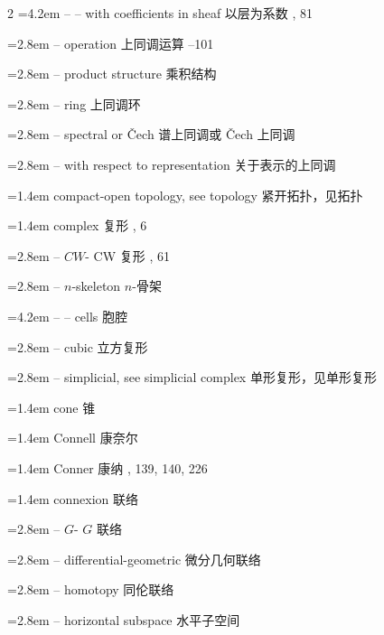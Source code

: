 \begin{multicols}{2}
\noindent\hangindent=4.2em -- -- with coefficients in sheaf \quad 以层为系数 , 81\par
\noindent\hangindent=2.8em -- operation \quad 上同调运算 --101\par
\noindent\hangindent=2.8em -- product structure \quad 乘积结构 \par
\noindent\hangindent=2.8em -- ring \quad 上同调环 \par
\noindent\hangindent=2.8em -- spectral or \v{C}ech \quad 谱上同调或 \v{C}ech 上同调 \par
\noindent\hangindent=2.8em -- with respect to representation \quad 关于表示的上同调 \par
\noindent\hangindent=1.4em compact-open topology, see topology \quad 紧开拓扑，见拓扑 \quad\par
\noindent\hangindent=1.4em complex \quad 复形 , 6\par
\noindent\hangindent=2.8em -- $CW$- \quad CW 复形 , 61\par
\noindent\hangindent=2.8em -- $n$-skeleton \quad $n$-骨架 \par
\noindent\hangindent=4.2em -- -- cells \quad 胞腔 \par
\noindent\hangindent=2.8em -- cubic \quad 立方复形 \par
\noindent\hangindent=2.8em -- simplicial, see simplicial complex \quad 单形复形，见单形复形 \quad\par
\noindent\hangindent=1.4em cone \quad 锥 \par
\noindent\hangindent=1.4em Connell \quad 康奈尔 \par
\noindent\hangindent=1.4em Conner \quad 康纳 , 139, 140, 226\par
\noindent\hangindent=1.4em connexion \quad 联络 \par
\noindent\hangindent=2.8em -- $G$- \quad $G$ 联络 \par
\noindent\hangindent=2.8em -- differential-geometric \quad 微分几何联络 \par
\noindent\hangindent=2.8em -- homotopy \quad 同伦联络 \par
\noindent\hangindent=2.8em -- horizontal subspace \quad 水平子空间 \par

\end{multicols}
